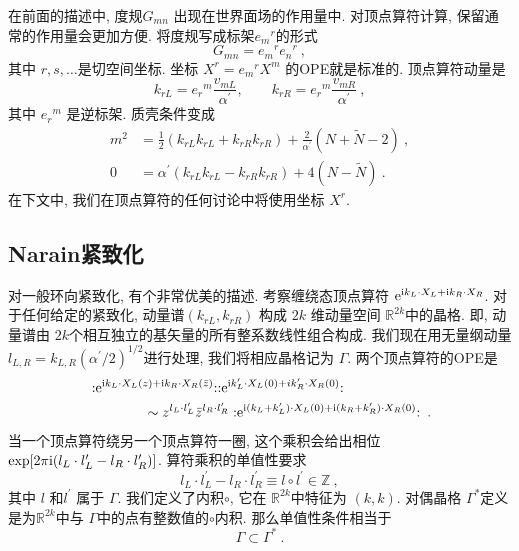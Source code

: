 在前面的描述中, 度规$G_{m n}$ 出现在世界面场的作用量中. 对顶点算符计算, 保留通常的作用量会更加方便. 将度规写成标架$e_{m}{}^{r}$的形式
\begin{equation}
	G_{m n}=e_{m}{}^{r} e_{n}{}^{r} \:, \label{8.4.13}
\end{equation}
其中 $r, s, \ldots$是切空间坐标. 坐标 $X^{r}=e_{m}{}^{r} X^{m}$ 的OPE就是标准的. 顶点算符动量是
\begin{equation}
	k_{r L}=e_{r}{}^{m} \frac{v_{m L}}{\alpha^{\prime}}, \qquad k_{r R}=e_{r}{}^{m} \frac{v_{m R}}{\alpha^{\prime}} \:, \label{8.4.14}
\end{equation}
其中 $e_{r}{}^{m} $ 是逆标架. 质壳条件变成
\begin{subequations} \label{8.4.15}
\begin{align}
		m^{2} &=\frac{1}{2}(k_{r L} k_{r L}+k_{r R} k_{r R})+\frac{2}{\alpha^{\prime}}(N+\tilde{N}-2) \:, \label{8.4.15a} \\	
		0 &= \alpha^{\prime}(k_{r L} k_{r L}-k_{r R} k_{r R})+4(N-\tilde{N}) \:. \label{8.4.15b}
\end{align}
\end{subequations}
在下文中, 我们在顶点算符的任何讨论中将使用坐标 $X^{r}$.

\subsection*{Narain紧致化}
对一般环向紧致化, 有个非常优美的描述. 考察缠绕态顶点算符 $\mathrm{e}^{\mathrm{i} k_{L} \cdot X_{L}+\mathrm{i} k_{R} \cdot X_{R}}$. 
对于任何给定的紧致化, 动量谱$(k_{r L}, k_{r R})$ 构成 $2 k$ 维动量空间 $\mathds{R}^{2 k}$中的晶格. 
即, 动量谱由 $2 k$个相互独立的基矢量的所有整系数线性组合构成. 我们现在用无量纲动量 $l_{L, R}=k_{L, R}(\alpha^{\prime}/2)^{1 / 2}$进行处理, 
我们将相应晶格记为 $\Gamma $. 两个顶点算符的OPE是
	\begin{align}
		&:\mathrel{\mathrm{e}^{\mathrm{i} k_{L} \cdot X_{L}(z)+\mathrm{i} k_{R} \cdot X_{R}(\bar{z})} }: 
		:\mathrel{\mathrm{e}^{\mathrm{i} k_{L}^{\prime} \cdot X_{L}(0)+i k_{R}^{\prime} \cdot X_{R}(0)}}: \nonumber \\
		&\qquad \qquad \sim z^{l_{L} \cdot l_{L}^{\prime}} \bar{z}^{l_{R} \cdot l_{R}^{\prime}}
		:\mathrel{ \mathrm{e}^{\mathrm{i}(k_{L}+k_{L}^{\prime}) \cdot X_{L}(0)+\mathrm{i}(k_{R}+k_{R}^{\prime}) \cdot X_{R}(0)} }: \:. \label{8.4.16}
	\end{align}
当一个顶点算符绕另一个顶点算符一圈, 这个乘积会给出相位$\exp[2 \pi \mathrm{i}(l_{L} \cdot l_{L}^{\prime}-l_{R} \cdot l_{R}^{\prime})]$. 
算符乘积的单值性要求
\begin{equation}
	l_{L} \cdot l_{L}^{\prime}-l_{R} \cdot l_{R}^{\prime} \equiv l \vysmwhtcircle l^{\prime} \in \mathds{Z} \:, \label{8.4.17}
\end{equation}
其中 $l$ 和$l^{\prime}$ 属于 $\Gamma$. 我们定义了内积$\vysmwhtcircle$, 它在 $\mathds{R}^{2 k} $中特征为 $(k, k)$. 
对偶晶格 $\Gamma^{*}$定义是为$\mathds{R}^{2 k}$中与 $\Gamma$中的点有整数值的$\vysmwhtcircle$内积. 那么单值性条件相当于
\begin{equation}
	\Gamma \subset \Gamma^{*} \:. \label{8.4.18}
\end{equation}

